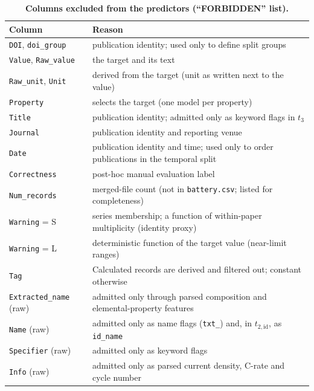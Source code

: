 \documentclass[11pt]{article}
\begin{document}
\begin{table}[t]
    \centering\small
    \caption{\textbf{Columns excluded from the predictors (``FORBIDDEN'' list).}}
    \label{tab:forbidden}
    \begin{tabular}{@{}l p{11.5cm}@{}}
        \toprule
        Column & Reason \\
        \midrule
        \texttt{DOI}, \texttt{doi\_group} & publication identity; used only to define split groups \\
        \texttt{Value}, \texttt{Raw\_value} & the target and its text \\
        \texttt{Raw\_unit}, \texttt{Unit} & derived from the target (unit as written next to the value) \\
        \texttt{Property} & selects the target (one model per property) \\
        \texttt{Title} & publication identity; admitted only as keyword flags in $t_3$ \\
        \texttt{Journal} & publication identity and reporting venue \\
        \texttt{Date} & publication identity and time; used only to order publications in the temporal split \\
        \texttt{Correctness} & post-hoc manual evaluation label \\
        \texttt{Num\_records} & merged-file count (not in \texttt{battery.csv}; listed for completeness) \\
        \texttt{Warning} = S & series membership; a function of within-paper multiplicity (identity proxy) \\
        \texttt{Warning} = L & deterministic function of the target value (near-limit ranges) \\
        \texttt{Tag} & Calculated records are derived and filtered out; constant otherwise \\
        \texttt{Extracted\_name} (raw) & admitted only through parsed composition and elemental-property features \\
        \texttt{Name} (raw) & admitted only as name flags (\texttt{txt\_}) and, in $t_{2,\mathrm{id}}$, as \texttt{id\_name} \\
        \texttt{Specifier} (raw) & admitted only as keyword flags \\
        \texttt{Info} (raw) & admitted only as parsed current density, C-rate and cycle number \\
        \bottomrule
    \end{tabular}
\end{table}
\end{document}
